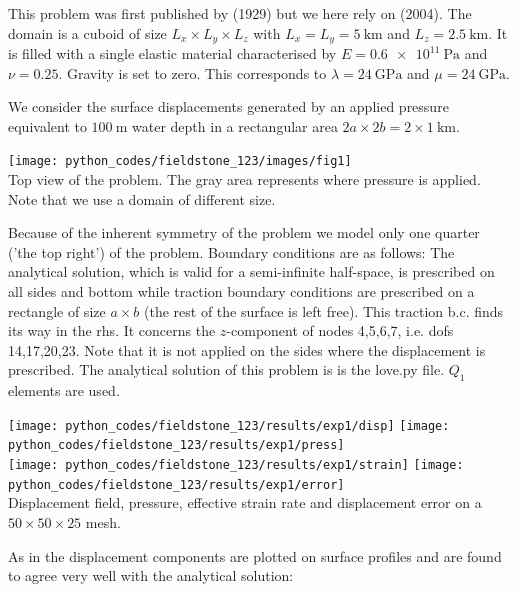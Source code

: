 This problem was first published by \textcite{love29} (1929)
but we here rely on \textcite{bebe04} (2004).
The domain is a cuboid of size $L_x\times L_y \times L_z$ with $L_x=L_y=\SI{5}{\km}$
and $L_z=\SI{2.5}{\km}$. It is filled with a single elastic material characterised 
by $E=\SI{0.6e11}{\pascal}$ and $\nu=0.25$. Gravity is set to zero.
This corresponds to $\lambda= \SI{24}{\giga\pascal}$ and $\mu=\SI{24}{\giga\pascal}$.

We consider the surface displacements generated by an 
applied pressure equivalent to $\SI{100}{\meter}$ 
water depth in a rectangular area $2a\times 2b = 2\times 1~\si{\km}$. 

\begin{center}
\texttt{[image: python\_codes/fieldstone\_123/images/fig1]}\\
{\captionfont Top view of the problem. The gray area represents where 
pressure is applied. Note that we use a domain of different size.}
\end{center}

Because of the inherent symmetry of the problem we model only one quarter ('the top right')
of the problem. Boundary conditions are as follows: The analytical solution,
which is valid for a semi-infinite half-space, is prescribed on 
all sides and bottom while traction boundary conditions are prescribed on a 
rectangle of size $a\times b$ (the rest of the surface is left free).
This traction b.c. finds its way in the rhs. It concerns the $z$-component of
nodes 4,5,6,7, i.e. dofs 14,17,20,23. Note that it is not applied on the sides 
where the displacement is prescribed.
The analytical solution of this problem is is the {\pythonfile love.py} file.
$Q_1$ elements are used. 

\begin{center}
\texttt{[image: python\_codes/fieldstone\_123/results/exp1/disp]} 
\texttt{[image: python\_codes/fieldstone\_123/results/exp1/press]} \\
\texttt{[image: python\_codes/fieldstone\_123/results/exp1/strain]} 
\texttt{[image: python\_codes/fieldstone\_123/results/exp1/error]} \\
{\captionfont Displacement field, pressure, effective strain rate and 
displacement error on a $50\times 50\times 25$ mesh.}
\end{center} 

As in \textcite{bebe04} the displacement components are plotted on surface profiles
and are found to agree very well with the analytical solution:

